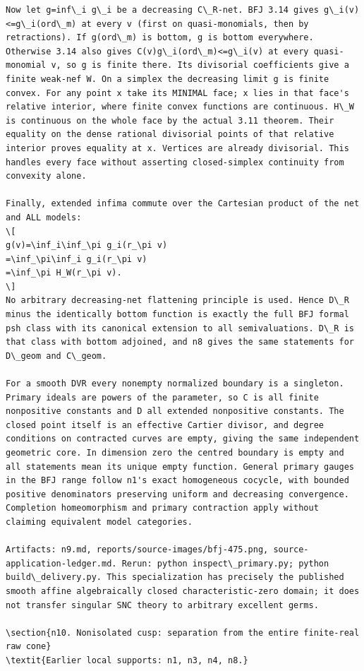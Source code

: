 \documentclass[11pt]{article}
\begin{document}
\begin{Verbatim}[breaklines,fontsize=\tiny]
Now let g=inf\_i g\_i be a decreasing C\_R-net. BFJ 3.14 gives g\_i(v)<=g\_i(ord\_m) at every v (first on quasi-monomials, then by retractions). If g(ord\_m) is bottom, g is bottom everywhere. Otherwise 3.14 also gives C(v)g\_i(ord\_m)<=g\_i(v) at every quasi-monomial v, so g is finite there. Its divisorial coefficients give a finite weak-nef W. On a simplex the decreasing limit g is finite convex. For any point x take its MINIMAL face; x lies in that face's relative interior, where finite convex functions are continuous. H\_W is continuous on the whole face by the actual 3.11 theorem. Their equality on the dense rational divisorial points of that relative interior proves equality at x. Vertices are already divisorial. This handles every face without asserting closed-simplex continuity from convexity alone.

Finally, extended infima commute over the Cartesian product of the net and ALL models:
\[
g(v)=\inf_i\inf_\pi g_i(r_\pi v)
=\inf_\pi\inf_i g_i(r_\pi v)
=\inf_\pi H_W(r_\pi v).
\]
No arbitrary decreasing-net flattening principle is used. Hence D\_R minus the identically bottom function is exactly the full BFJ formal psh class with its canonical extension to all semivaluations. D\_R is that class with bottom adjoined, and n8 gives the same statements for D\_geom and C\_geom.

For a smooth DVR every nonempty normalized boundary is a singleton. Primary ideals are powers of the parameter, so C is all finite nonpositive constants and D all extended nonpositive constants. The closed point itself is an effective Cartier divisor, and degree conditions on contracted curves are empty, giving the same independent geometric core. In dimension zero the centred boundary is empty and all statements mean its unique empty function. General primary gauges in the BFJ range follow n1's exact homogeneous cocycle, with bounded positive denominators preserving uniform and decreasing convergence. Completion homeomorphism and primary contraction apply without claiming equivalent model categories.

Artifacts: n9.md, reports/source-images/bfj-475.png, source-application-ledger.md. Rerun: python inspect\_primary.py; python build\_delivery.py. This specialization has precisely the published smooth affine algebraically closed characteristic-zero domain; it does not transfer singular SNC theory to arbitrary excellent germs.

\section{n10. Nonisolated cusp: separation from the entire finite-real raw cone}
\textit{Earlier local supports: n1, n3, n4, n8.}


\end{Verbatim}
\end{document}

